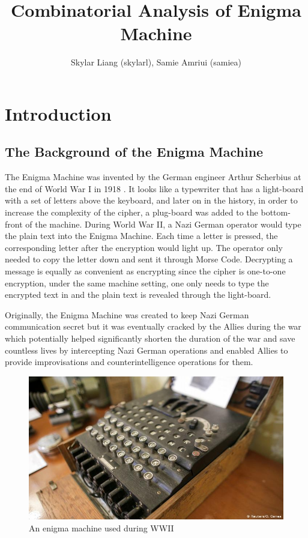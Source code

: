 \documentclass{article}
\title{Combinatorial Analysis of Enigma Machine}
\author{\large Skylar Liang (skylarl), Samie Amriui (samiea) \par}
\date{\normalsize March 10, 2020 \par}
\begin{document}
\maketitle

\section{Introduction}
\subsection{The Background of the Enigma Machine}
The Enigma Machine was invented by the German engineer Arthur Scherbius at the end of World War I in 1918 \cite{abny}. It looks like a typewriter that has a light-board with a set of letters above the keyboard, and later on in the history, in order to increase the complexity of the cipher, a plug-board was added to the bottom-front of the machine. During World War II, a Nazi German operator would type the plain text into the Enigma Machine. Each time a letter is pressed, the corresponding letter after the encryption would light up. The operator only needed to copy the letter down and sent it through Morse Code. Decrypting a message is equally as convenient as encrypting since the cipher is one-to-one encryption, under the same machine setting, one only needs to type the encrypted text in and the plain text is revealed through the light-board. \\
\par Originally, the Enigma Machine was created to keep Nazi German communication secret but it was eventually cracked by the Allies during the war which potentially helped significantly shorten the duration of the war and save countless lives by intercepting Nazi German operations and enabled Allies to provide improvisations and counterintelligence operations for them.

\begin{figure}[h!]
\centering 
\includegraphics[scale=0.4]{Enigma_Machine.jpg}
\caption{An enigma machine used during WWII}
\label{fig:kuiper-belt}
\end{figure}
\end{document}
